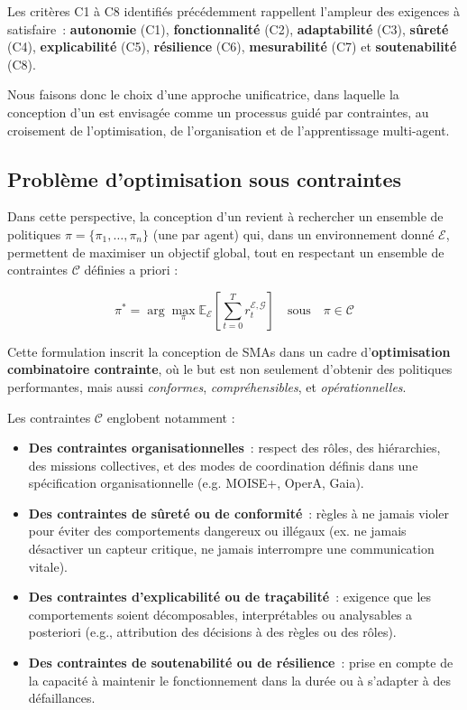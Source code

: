 Les critères C1 à C8 identifiés précédemment rappellent l’ampleur des exigences à satisfaire~: \textbf{autonomie} (C1), \textbf{fonctionnalité} (C2), \textbf{adaptabilité} (C3), \textbf{sûreté} (C4), \textbf{explicabilité} (C5), \textbf{résilience} (C6), \textbf{mesurabilité} (C7) et \textbf{soutenabilité} (C8).

Nous faisons donc le choix d’une approche unificatrice, dans laquelle la conception d’un  est envisagée comme un processus guidé par contraintes, au croisement de l’optimisation, de l’organisation et de l’apprentissage multi-agent.

\subsection{Problème d’optimisation sous contraintes}

Dans cette perspective, la conception d’un  revient à rechercher un ensemble de politiques $\pi = \{\pi_1, \dots, \pi_n\}$ (une par agent) qui, dans un environnement donné $\mathcal{E}$, permettent de maximiser un objectif global, tout en respectant un ensemble de contraintes $\mathcal{C}$ définies a priori :

\begin{equation}
    \pi^* = \arg\max_{\pi} \mathbb{E}_{\mathcal{E}} \left[ \sum_{t=0}^{T} r^{\mathcal{E}, \mathcal{G}}_t \right] \quad \text{sous} \quad \pi \in \mathcal{C}
\end{equation}

Cette formulation inscrit la conception de \acp{SMA} dans un cadre d’\textbf{optimisation combinatoire contrainte}, où le but est non seulement d’obtenir des politiques performantes, mais aussi \emph{conformes}, \emph{compréhensibles}, et \emph{opérationnelles}.

Les contraintes $\mathcal{C}$ englobent notamment :
\begin{itemize}
    \item \textbf{Des contraintes organisationnelles}~: respect des rôles, des hiérarchies, des missions collectives, et des modes de coordination définis dans une spécification organisationnelle (e.g. MOISE+, OperA, Gaia).
    \item \textbf{Des contraintes de sûreté ou de conformité}~: règles à ne jamais violer pour éviter des comportements dangereux ou illégaux (ex. ne jamais désactiver un capteur critique, ne jamais interrompre une communication vitale).
    \item \textbf{Des contraintes d’explicabilité ou de traçabilité}~: exigence que les comportements soient décomposables, interprétables ou analysables a posteriori (e.g., attribution des décisions à des règles ou des rôles).
    \item \textbf{Des contraintes de soutenabilité ou de résilience}~: prise en compte de la capacité à maintenir le fonctionnement dans la durée ou à s’adapter à des défaillances.
\end{itemize}

